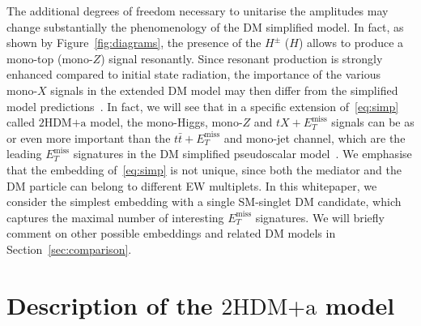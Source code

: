 \documentclass[a4paper, 11pt,notoc]{article}
\newcommand{\MET}{\ensuremath{E_T^\mathrm{miss}}\xspace}
\newcommand{\hdma}{\ensuremath{\textrm{2HDM+a}}\xspace}
\begin{document}
The additional degrees of freedom necessary to unitarise the amplitudes may change substantially the phenomenology of the DM simplified model. In fact, as shown by Figure~\ref{fig:diagrams}, the presence of the $H^\pm$ ($H$) allows to produce a mono-top (mono-$Z$)  signal resonantly. Since resonant production is strongly enhanced compared to initial state radiation, the  importance of the various mono-$X$ signals in the extended DM model may then differ from the simplified model predictions~\cite{Goncalves:2016iyg,Bauer:2017ota,Pani:2017qyd}. In fact, we will see that in a specific extension of~\eqref{eq:simp}  called \hdma model, the mono-Higgs, mono-$Z$ and $t X + \MET$ signals can be as or even more important than the $t \bar t + \MET$ and mono-jet channel, which are  the leading $\MET$ signatures in the DM simplified pseudoscalar model~\cite{Haisch:2012kf,Fox:2012ru,Buckley:2014fba,Harris:2014hga,Haisch:2015ioa,Mattelaer:2015haa,Backovic:2015soa,Neubert:2015fka,Arina:2016cqj}. We emphasise that the embedding of~\eqref{eq:simp} is not unique, since  both the mediator and the DM particle can belong to different EW multiplets. In this whitepaper, we consider the simplest embedding with a single SM-singlet DM candidate, which captures the maximal number of interesting $\MET$ signatures. We will briefly comment on other possible embeddings and related DM models in Section~\ref{sec:comparison}.  


\section{Description of the \hdma model}
\label{sec:modeldescription}
\end{document}
